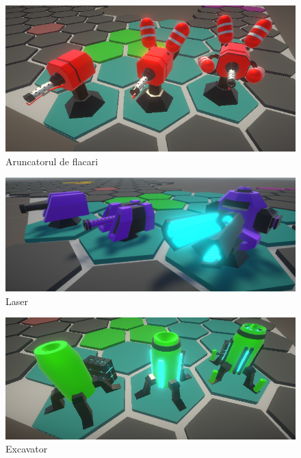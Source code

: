 \documentclass[12pt, a4paper]{article}
\begin{document}
	\begin{figure}[H]
		\centering
		\includegraphics[width=1\textwidth]{Flamethrower.png}
		\caption{Aruncatorul de flacari}
		\label{fig: machineCannon}
	\end{figure}
	
	\begin{figure}[H]
		\centering
		\includegraphics[width=1\textwidth]{railgun.png}
		\caption{Laser}
		\label{fig: railgun}
	\end{figure}

	\begin{figure}[H]
		\centering
		\includegraphics[width=1\textwidth]{Excavator.png}
		\caption{Excavator}
		\label{fig: excavator}
	\end{figure}
	
	
	
	
	
\end{document}
